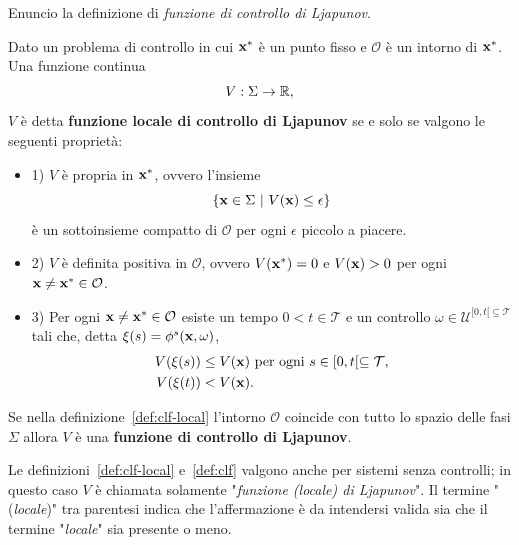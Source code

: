 Enuncio la definizione di \emph{funzione di controllo di Ljapunov}.
\begin{definition}
    Dato un problema di controllo in cui $\mathbf{x}^*$ è un punto fisso e
    $\mathcal O$ è un intorno di $\mathbf{x}^*$.
    Una funzione continua
    \begin{equation*}
        V : \Sigma \to \mathbb{R},
    \end{equation*}
    $V$ è detta \textbf{funzione locale di controllo di Ljapunov} se
    e solo se valgono le seguenti proprietà:

    \begin{itemize}
        \item 1) $V$ è propria in $\mathbf{x}^*$, ovvero l'insieme
        \begin{equation*}
            \left\{\mathbf{x} \in \Sigma\ |\ V(\mathbf{x}) \leq \epsilon \right\}
        \end{equation*}
        è un sottoinsieme compatto di $\mathcal O$ per ogni $\epsilon$ piccolo a piacere.
        \item 2) $V$ è definita positiva in $\mathcal O$, ovvero $V(\mathbf{x}^*) = 0$ e
        $V(\mathbf{x}) > 0$ per ogni $\mathbf{x} \neq \mathbf{x}^* \in \mathcal O$.
        \item 3) Per ogni $\mathbf{x} \neq \mathbf{x}^* \in \mathcal O$
        esiste un tempo $0 < t \in \mathcal T$ e un controllo $\omega \in \mathcal U^{[0,t[ \subseteq \mathcal T}$
        tali che, detta $\xi(s) = \phi^s(\mathbf{x}, \omega)$,
        \begin{align*}
            V(\xi(s)) &\leq V(\mathbf{x}) \text{ per ogni } s \in [0,t[ \subseteq \mathcal T, \\
            V(\xi(t)) &< V(\mathbf{x}).
        \end{align*}
    \end{itemize}

    \label{def:clf-local}
\end{definition}

\begin{definition}
    Se nella definizione~\ref{def:clf-local} l'intorno $\mathcal O$ coincide
    con tutto lo spazio delle fasi $\Sigma$ allora $V$ è una
    \textbf{funzione di controllo di Ljapunov}.
    \label{def:clf}
\end{definition}

Le definizioni~\ref{def:clf-local} e~\ref{def:clf} valgono anche per sistemi
senza controlli; in questo caso $V$ è chiamata solamente "\emph{funzione (locale) di Ljapunov}".
Il termine "(\emph{locale})" tra parentesi indica che l'affermazione è da intendersi valida
sia che il termine "\emph{locale}" sia presente o meno.

